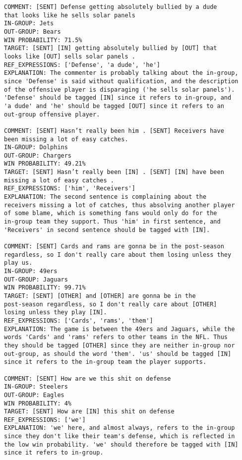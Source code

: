 \begin{verbatim}
COMMENT: [SENT] Defense getting absolutely bullied by a dude 
that looks like he sells solar panels
IN-GROUP: Jets
OUT-GROUP: Bears
WIN PROBABILITY: 71.5%
TARGET: [SENT] [IN] getting absolutely bullied by [OUT] that 
looks like [OUT] sells solar panels .
REF_EXPRESSIONS: ['Defense', 'a dude', 'he']
EXPLANATION: The commenter is probably talking about the in-group, 
since 'Defense' is said without qualification, and the description 
of the offensive player is disparaging ('he sells solar panels'). 
'Defense' should be tagged [IN] since it refers to in-group, and 
'a dude' and 'he' should be tagged [OUT] since it refers to an 
out-group offensive player.

COMMENT: [SENT] Hasn’t really been him . [SENT] Receivers have 
been missing a lot of easy catches.
IN-GROUP: Dolphins
OUT-GROUP: Chargers
WIN PROBABILITY: 49.21%
TARGET: [SENT] Hasn’t really been [IN] . [SENT] [IN] have been 
missing a lot of easy catches .
REF_EXPRESSIONS: ['him', 'Receivers']
EXPLANATION: The second sentence is complaining about the 
receivers missing a lot of catches, thus absolving another player 
of some blame, which is something fans would only do for the 
in-group team they support. Thus 'him' in first sentence, and 
'Receivers' in second sentence should be tagged with [IN].

COMMENT: [SENT] Cards and rams are gonna be in the post-season 
regardless, so I don't really care about them losing unless they 
play us.
IN-GROUP: 49ers
OUT-GROUP: Jaguars
WIN PROBABILITY: 99.71%
TARGET: [SENT] [OTHER] and [OTHER] are gonna be in the 
post-season regardless, so I don't really care about [OTHER] 
losing unless they play [IN].
REF_EXPRESSIONS: ['Cards', 'rams', 'them']
EXPLANATION: The game is between the 49ers and Jaguars, while the 
words 'Cards' and 'rams' refers to other teams in the NFL. Thus 
they should be tagged [OTHER] since they are neither in-group nor 
out-group, as should the word 'them'. 'us' should be tagged [IN] 
since it refers to the in-group team the player supports.

COMMENT: [SENT] How are we this shit on defense
IN-GROUP: Steelers
OUT-GROUP: Eagles
WIN PROBABILITY: 4%
TARGET: [SENT] How are [IN] this shit on defense
REF_EXPRESSIONS: ['we']
EXPLANATION: 'we' here, and almost always, refers to the in-group 
since they don't like their team's defense, which is reflected in 
the low win probability. 'we' should therefore be tagged with [IN] 
since it refers to in-group.


\end{verbatim}
